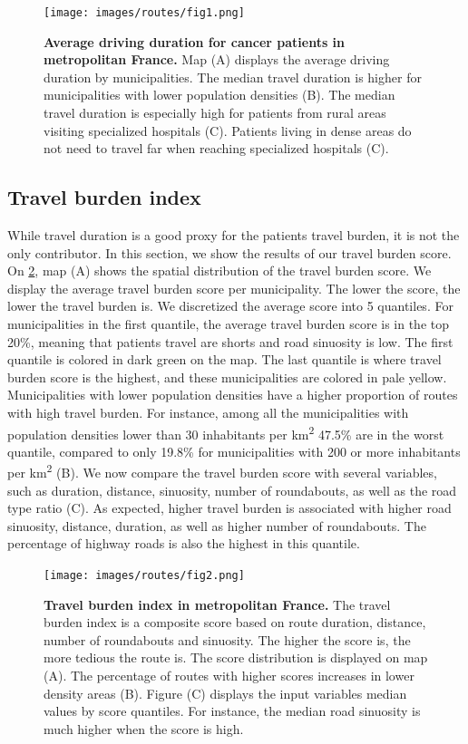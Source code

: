 \begin{figure}[h!]
    \texttt{[image: images/routes/fig1.png]}
    \centering
    \caption{ \textbf{Average driving duration for cancer patients in
            metropolitan France.} Map (A) displays the average driving duration by
        municipalities. The median travel duration is higher for municipalities
        with lower population densities (B). The median travel duration is
        especially high for patients from rural areas visiting specialized
        hospitals (C). Patients living in dense areas do not need to travel far
        when reaching specialized hospitals (C). }
    \label{fig:routes-duration-france}
\end{figure}

\subsection{Travel burden index}

While travel duration is a good proxy for the patients travel burden, it is not
the only contributor. In this section, we show the results of our travel burden
score. On \cref{fig:routes-burden-index}, map (A) shows the spatial distribution
of the travel burden score. We display the average travel burden score per
municipality. The lower the score, the lower the travel burden is. We
discretized the average score into 5 quantiles. For municipalities in the first
quantile, the average travel burden score is in the top 20\%, meaning that
patients travel are shorts and road sinuosity is low. The first quantile is
colored in dark green on the map. The last quantile is where travel burden score
is the highest, and these municipalities are colored in pale yellow.
Municipalities with lower population densities have a higher proportion of
routes with high travel burden. For instance, among all the municipalities with
population densities lower than 30 inhabitants per km\textsuperscript{2} 47.5\%
are in the worst quantile, compared to only 19.8\% for municipalities with 200
or more inhabitants per km\textsuperscript{2} (B). We now compare the travel
burden score with several variables, such as duration, distance, sinuosity,
number of roundabouts, as well as the road type ratio (C). As expected, higher
travel burden is associated with higher road sinuosity, distance, duration, as
well as higher number of roundabouts. The percentage of highway roads is also
the highest in this quantile.

\begin{figure}[h!]
    \texttt{[image: images/routes/fig2.png]}
    \centering
    \caption{
        \textbf{Travel burden index in metropolitan France.}
        The travel burden index is a composite score based on route duration,
        distance, number of roundabouts and sinuosity. The higher the score is,
        the more tedious the route is. The score distribution is displayed on
        map (A). The percentage of routes with higher scores increases in lower
        density areas (B). Figure (C) displays the input variables median values
        by score quantiles. For instance, the median road sinuosity is much
        higher when the score is high. }
    \label{fig:routes-burden-index}
\end{figure}

